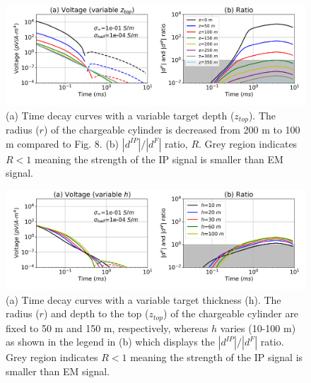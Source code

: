 \documentclass[manuscript]{geophysics}
\newcommand{\dip}{d^{IP}}
\begin{document}
\begin{figure}[htb]
  \centering
  \includegraphics[width=1.0\textwidth]{figures/data_targetsize_1.png}
  \caption{(a) Time decay curves with a variable target depth ($z_{top}$). The radius ($r$) of the chargeable cylinder is decreased from 200 m to 100 m compared to Fig.  8. (b) $|\dip|/|d^F|$ ratio, $R$. Grey region indicates $R<1$ meaning the strength of the IP signal is smaller than EM signal.}
  \label{fig:9}
\end{figure}

\begin{figure}[htb]
  \centering
  \includegraphics[width=1.0\textwidth]{figures/data_targetsize_2.png}
  \caption{(a) Time decay curves with a variable target thickness (h). The radius ($r$) and depth to the top ($z_{top}$) of the chargeable cylinder are fixed to 50 m and 150 m, respectively, whereas $h$ varies (10-100 m) as shown in the legend in (b) which displays the $|\dip|/|d^F|$ ratio. Grey region indicates $R<1$ meaning the strength of the IP signal is smaller than EM signal.}
  \label{fig:10}
\end{figure}
\clearpage
\end{document}
